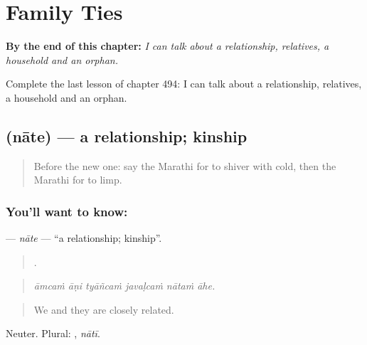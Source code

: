 
\chapter{Family Ties}
\label{ch:mr-family-ties}

\begin{chapteropening}
\textbf{By the end of this chapter:} \emph{I can talk about a relationship, relatives, a household and an orphan.}

Complete the last lesson of chapter 494: I can talk about a relationship, relatives, a household and an orphan.
\end{chapteropening}

\section[\texorpdfstring{\mr{नाते} (nāte)}{नाते (nāte)}]{ (nāte) — a relationship; kinship}

\label{lesson:MR-C494-nate}



\begin{quote}
Before the new one: say the Marathi for to shiver with cold, then the Marathi for to limp.
\end{quote}

\subsection*{You'll want to know: }
\textbf{} — \emph{nāte} — \textquotedblleft{}a relationship; kinship\textquotedblright{}.

\begin{quote}
     .
\end{quote}

\begin{quote}
\emph{āmcaṁ āṇi tyāñcaṁ javaḷcaṁ nātaṁ āhe.}
\end{quote}

\begin{quote}
We and they are closely related.
\end{quote}

Neuter. Plural: , \emph{nātī}.

